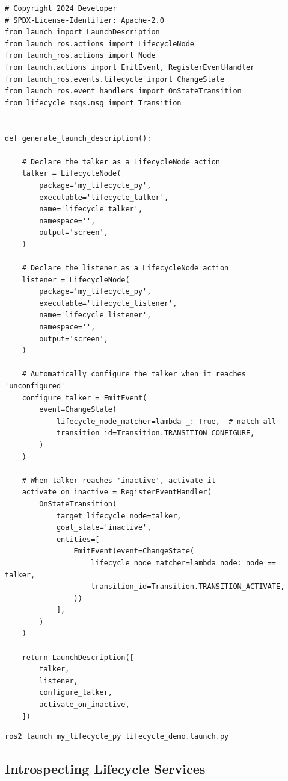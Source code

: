 \documentclass[12pt,a4paper]{article}
\begin{document}
\begin{lstlisting}[style=python,caption={launch/lifecycle\_demo.launch.py}]
# Copyright 2024 Developer
# SPDX-License-Identifier: Apache-2.0
from launch import LaunchDescription
from launch_ros.actions import LifecycleNode
from launch_ros.actions import Node
from launch.actions import EmitEvent, RegisterEventHandler
from launch_ros.events.lifecycle import ChangeState
from launch_ros.event_handlers import OnStateTransition
from lifecycle_msgs.msg import Transition


def generate_launch_description():

    # Declare the talker as a LifecycleNode action
    talker = LifecycleNode(
        package='my_lifecycle_py',
        executable='lifecycle_talker',
        name='lifecycle_talker',
        namespace='',
        output='screen',
    )

    # Declare the listener as a LifecycleNode action
    listener = LifecycleNode(
        package='my_lifecycle_py',
        executable='lifecycle_listener',
        name='lifecycle_listener',
        namespace='',
        output='screen',
    )

    # Automatically configure the talker when it reaches 'unconfigured'
    configure_talker = EmitEvent(
        event=ChangeState(
            lifecycle_node_matcher=lambda _: True,  # match all
            transition_id=Transition.TRANSITION_CONFIGURE,
        )
    )

    # When talker reaches 'inactive', activate it
    activate_on_inactive = RegisterEventHandler(
        OnStateTransition(
            target_lifecycle_node=talker,
            goal_state='inactive',
            entities=[
                EmitEvent(event=ChangeState(
                    lifecycle_node_matcher=lambda node: node == talker,
                    transition_id=Transition.TRANSITION_ACTIVATE,
                ))
            ],
        )
    )

    return LaunchDescription([
        talker,
        listener,
        configure_talker,
        activate_on_inactive,
    ])
\end{lstlisting}

\begin{lstlisting}[style=bash,caption={Running the launch file}]
ros2 launch my_lifecycle_py lifecycle_demo.launch.py
\end{lstlisting}

\subsection{Introspecting Lifecycle Services}
\end{document}
